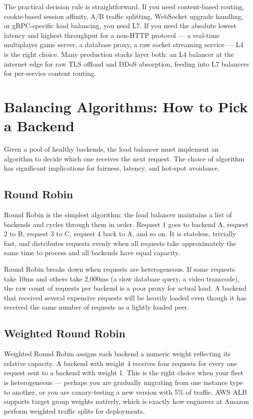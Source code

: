 \documentclass[11pt,a4paper]{article}
\begin{document}
The practical decision rule is straightforward. If you need content-based routing, cookie-based
session affinity, A/B traffic splitting, WebSocket upgrade handling, or gRPC-specific load
balancing, you need L7. If you need the absolute lowest latency and highest throughput for a
non-HTTP protocol --- a real-time multiplayer game server, a database proxy, a raw socket streaming
service --- L4 is the right choice. Many production stacks layer both: an L4 balancer at the
internet edge for raw TLS offload and DDoS absorption, feeding into L7 balancers for per-service
content routing.

\section{Balancing Algorithms: How to Pick a Backend}

Given a pool of healthy backends, the load balancer must implement an algorithm to decide which one
receives the next request. The choice of algorithm has significant implications for fairness,
latency, and hot-spot avoidance.

\subsection{Round Robin}

Round Robin is the simplest algorithm: the load balancer maintains a list of backends and cycles
through them in order. Request 1 goes to backend A, request 2 to B, request 3 to C, request 4
back to A, and so on. It is stateless, trivially fast, and distributes requests evenly when all
requests take approximately the same time to process and all backends have equal capacity.

Round Robin breaks down when requests are heterogeneous. If some requests take 10ms and others
take 2,000ms (a slow database query, a video transcode), the raw count of requests per backend is
a poor proxy for actual load. A backend that received several expensive requests will be heavily
loaded even though it has received the same number of requests as a lightly loaded peer.

\subsection{Weighted Round Robin}

Weighted Round Robin assigns each backend a numeric weight reflecting its relative capacity. A
backend with weight 4 receives four requests for every one request sent to a backend with weight 1.
This is the right choice when your fleet is heterogeneous --- perhaps you are gradually migrating
from one instance type to another, or you are canary-testing a new version with 5\% of traffic.
AWS ALB supports target group weights natively, which is exactly how engineers at Amazon perform
weighted traffic splits for deployments.
\end{document}
